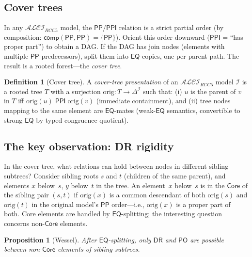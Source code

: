 \documentclass[
]{ceurart}
\newtheorem{proposition}[theorem]{Proposition}
\theoremstyle{definition}
\newtheorem{definition}[theorem]{Definition}
\newcommand{\ALCIRCC}[1]{\ensuremath{\mathcal{ALCI}_{\mathit{RCC#1}}}}
\newcommand{\DR}{\ensuremath{\mathsf{DR}}}
\newcommand{\PO}{\ensuremath{\mathsf{PO}}}
\newcommand{\EQ}{\ensuremath{\mathsf{EQ}}}
\newcommand{\PP}{\ensuremath{\mathsf{PP}}}
\newcommand{\PPI}{\ensuremath{\mathsf{PPI}}}
\newcommand{\comp}{\ensuremath{\mathsf{comp}}}
\newcommand{\Core}{\ensuremath{\mathsf{Core}}}
\begin{document}
\subsection{Cover trees}

In any $\ALCIRCC{5}$ model, the $\PP/\PPI$ relation is a
strict partial order (by composition: $\comp(\PP,\PP) = \{\PP\}$).
Orient this order downward ($\PPI$ = ``has proper part'') to
obtain a DAG.  If the DAG has join nodes (elements with multiple
$\PP$-predecessors), split them into $\EQ$-copies, one per parent
path.  The result is a rooted forest---the \emph{cover tree}.

\begin{definition}[Cover tree]
A \emph{cover-tree presentation} of an $\ALCIRCC{5}$ model
$\mathcal{I}$ is a rooted tree $T$ with a surjection
$\mathrm{orig}: T \to \Delta^{\mathcal{I}}$ such that:
(i) $u$ is the parent of $v$ in $T$ iff
$\mathrm{orig}(u) \;\PPI\; \mathrm{orig}(v)$ (immediate containment),
and (ii) tree nodes mapping to the same element are $\EQ$-mates
(weak-$\EQ$ semantics, convertible to strong-$\EQ$ by typed
congruence quotient).
\end{definition}

\subsection{The key observation: DR rigidity}

In the cover tree, what relations can hold between nodes in
different sibling subtrees?  Consider sibling roots $s$ and $t$
(children of the same parent), and elements $x$ below~$s$, $y$
below~$t$ in the tree.
An element~$x$ below~$s$ is in the \emph{$\Core$} of the sibling
pair $(s,t)$ if $\mathrm{orig}(x)$ is a common descendant of both
$\mathrm{orig}(s)$ and $\mathrm{orig}(t)$ in the original model's
$\PP$ order---i.e., $\mathrm{orig}(x)$ is a proper part of both.
Core elements are handled by $\EQ$-splitting; the interesting
question concerns non-$\Core$ elements.

\begin{proposition}[Wessel]
\label{prop:dr-rigid}
After $\EQ$-splitting, only $\DR$ and $\PO$ are possible between
non-$\Core$ elements of sibling subtrees.
\end{proposition}
\end{document}
